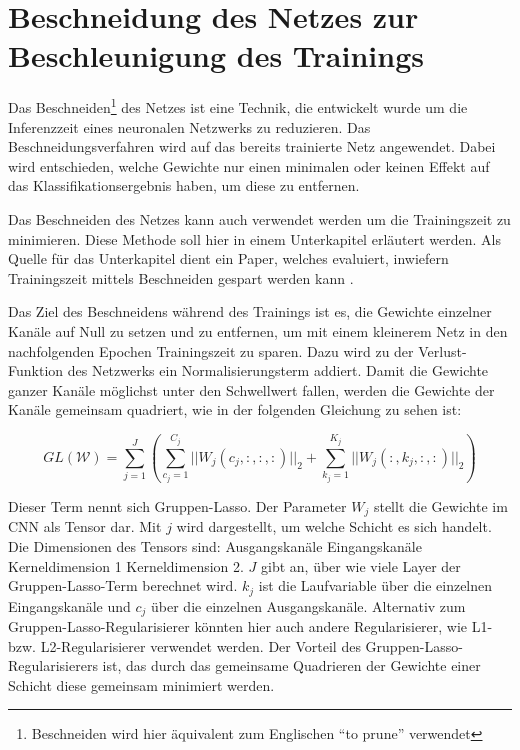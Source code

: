 \section{Beschneidung des Netzes zur Beschleunigung des Trainings}
\label{sec:prunetrain}
Das Beschneiden\footnote{Beschneiden wird hier äquivalent zum Englischen  "`to prune"' verwendet} des Netzes ist eine Technik, die entwickelt wurde um die Inferenzzeit eines neuronalen Netzwerks zu reduzieren. Das Beschneidungsverfahren wird auf das bereits trainierte Netz angewendet. Dabei wird entschieden, welche Gewichte nur einen minimalen oder keinen Effekt auf das Klassifikationsergebnis haben, um diese zu entfernen.

Das Beschneiden des Netzes kann auch verwendet werden um die Trainingszeit zu minimieren. Diese Methode soll hier in einem Unterkapitel erläutert werden. Als Quelle für das Unterkapitel dient ein Paper, welches evaluiert, inwiefern Trainingszeit mittels Beschneiden gespart werden kann \cite{prunetrain}.


Das Ziel des Beschneidens während des Trainings ist es, die Gewichte einzelner Kanäle auf Null zu setzen und zu entfernen, um mit einem kleinerem Netz in den nachfolgenden Epochen Trainingszeit zu sparen. Dazu wird zu der Verlust-Funktion des Netzwerks ein Normalisierungsterm addiert. Damit die Gewichte ganzer Kanäle möglichst unter den Schwellwert fallen, werden die Gewichte der Kanäle gemeinsam quadriert, wie in der folgenden Gleichung zu sehen ist:

\begin{equation}
GL(\mathcal{W})=\sum_{j=1}^{J} \left( \sum_{c_j=1}^{C_j} || W_{j} (c_j,:,:,:) ||_2 + \sum_{k_j=1}^{K_j} || W_{j}(:,k_j,:,:)||_2 \right)
 \label{equ:PTloss}
\end{equation}

Dieser Term nennt sich Gruppen-Lasso. Der Parameter $W_{j}$ stellt die Gewichte im CNN als Tensor dar. Mit $j$ wird dargestellt, um welche Schicht es sich handelt. Die Dimensionen des Tensors sind: Ausgangskanäle \texttimes Eingangskanäle \texttimes Kerneldimension 1 \texttimes Kerneldimension 2. $J$ gibt an, über wie viele Layer der Gruppen-Lasso-Term berechnet wird. $k_j$ ist die Laufvariable über die einzelnen Eingangskanäle und $c_j$ über die einzelnen Ausgangskanäle. Alternativ zum Gruppen-Lasso-Regularisierer könnten hier auch andere Regularisierer, wie L1- bzw. L2-Regularisierer verwendet werden. Der Vorteil des Gruppen-Lasso-Regularisierers ist, das durch das gemeinsame Quadrieren der Gewichte einer Schicht diese gemeinsam minimiert werden.


